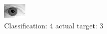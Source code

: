 \begin{figure}[h!]
\begin{center}
\includegraphics[width=0.60\columnwidth]{figures/ID2221_class_4_target_3.png}
\end{center}
\caption{ Classification: 4 actual target: 3}
\label{fig:ID2221_class_4_target_3}
\end{figure}
